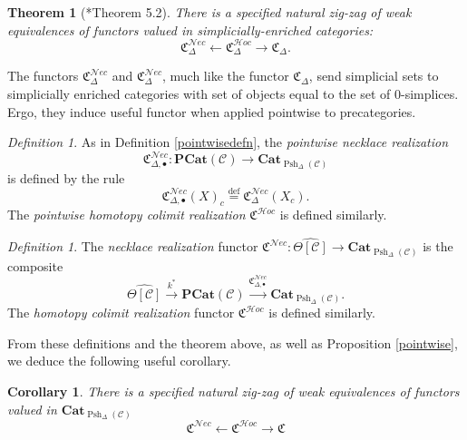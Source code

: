 \documentclass[leqno]{article}
\numberwithin{equation}{subsection}
\theoremstyle{plain}   %
\newtheorem{thm}[equation]{Theorem}
\newtheorem{cor}[equation]{Corollary}
\theoremstyle{remark}
\newtheorem{defn}[equation]{Definition}
\theoremstyle{plain}
\newcommand{\Nec}{\ensuremath{{\mathcal{N}ec}}}
\newcommand{\Hoc}{\ensuremath{{\mathcal{H}oc}}}
\newcommand{\Cat}{\ensuremath{\mathbf{Cat}}}
\newcommand{\C}{\ensuremath{\mathcal{C}}}
\newcommand{\defeq}{\overset{\mathrm{def}}=}
\newcommand{\cellset}{\ensuremath{\widehat{\Theta[\mathcal{C}]}}}
\newcommand{\spsh}{\ensuremath{\operatorname{Psh}_\Delta(\mathcal{C})}}
\begin{document}
\begin{thm}[\cite{ds1}*{Theorem 5.2}]
	There is a specified natural zig-zag of weak equivalences of functors valued in simplicially-enriched categories:
	\[
		\mathfrak{C}^{\Nec}_\Delta \leftarrow \mathfrak{C}^{\Hoc}_\Delta \to \mathfrak{C}_\Delta.
	\]
\end{thm}

The functors \(\mathfrak{C}_\Delta^{\Nec}\) and \(\mathfrak{C}_\Delta^{\Nec}\), much like the functor \(\mathfrak{C}_\Delta\), send simplicial sets to simplicially enriched categories with set of objects equal to the set of \(0\)-simplices.  Ergo, they induce useful functor when applied pointwise to precategories.
\begin{defn}
	As in Definition \ref{pointwisedefn},  the \emph{pointwise necklace realization}
	\[
		\mathfrak{C}^{\Nec}_{\Delta,\bullet}:\mathbf{PCat}(\C) \to \Cat_{\spsh}
	\] 
	is defined by the rule
	\[
		\mathfrak{C}^{\Nec}_{\Delta,\bullet}(X)_c\defeq \mathfrak{C}^{\Nec}_{\Delta}(X_c).
	\]
	The \emph{pointwise homotopy colimit realization} \(\mathfrak{C}^{\Hoc}\) is defined similarly.  
\end{defn}

\begin{defn}
	The \emph{necklace realization} functor \(\mathfrak{C}^{\Nec}:\cellset \to \Cat_{\spsh}\) is the composite
	\[
		\cellset \xrightarrow{k^\ast} \mathbf{PCat}(\C) \xrightarrow{\mathfrak{C}^{\Nec}_{\Delta,\bullet}} \Cat_{\spsh}.
	\]
	The \emph{homotopy colimit realization} functor \(\mathfrak{C}^{\Hoc}\) is defined similarly.
\end{defn}

From these definitions and the theorem above, as well as Proposition \ref{pointwise}, we deduce the following useful corollary.

\begin{cor}\label{necthm}
	There is a specified natural zig-zag of weak equivalences of functors valued in \(\Cat_{\spsh}\)
	\[
		\mathfrak{C}^{\Nec} \leftarrow \mathfrak{C}^{\Hoc} \to \mathfrak{C}
	\]
\end{cor}
\end{document}
